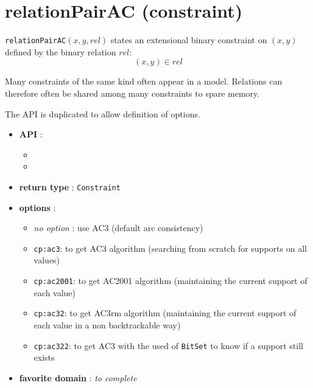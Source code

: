 \label{relationpairac}
\hypertarget{relationpairac}{}

\section{relationPairAC (constraint)}\label{relationpairac:relationpairacconstraint}\hypertarget{relationpairac:relationpairacconstraint}{}
\begin{notedef}
  \texttt{relationPairAC}$(x,y,rel)$ states an extensional binary constraint on $(x,y)$ defined by the binary relation $rel$:
$$(x,y)\in rel$$
\end{notedef}
Many constraints of the same kind often appear in a model. Relations can therefore often be shared among many constraints to spare memory.

The API is duplicated to allow definition of options.

\begin{itemize}
	\item \textbf{API} :
	\begin{itemize}
		\item {}
		\item {}
	\end{itemize}
	\item \textbf{return type} : \texttt{Constraint}
	\item \textbf{options} :
	\begin{itemize}
		\item \emph{no option} : use AC3 (default arc consistency)
		\item \texttt{cp:ac3}: to get AC3 algorithm (searching from scratch for supports on all values)
		\item \texttt{cp:ac2001}: to get AC2001 algorithm (maintaining the current support of each value)
		\item \texttt{cp:ac32}: to get AC3rm algorithm (maintaining the current support of each value in a non backtrackable way)
		\item \texttt{cp:ac322}: to get AC3 with the used of \texttt{BitSet} to know if a support still exists
	\end{itemize}
	\item \textbf{favorite domain} : \emph{to complete}
\end{itemize}

